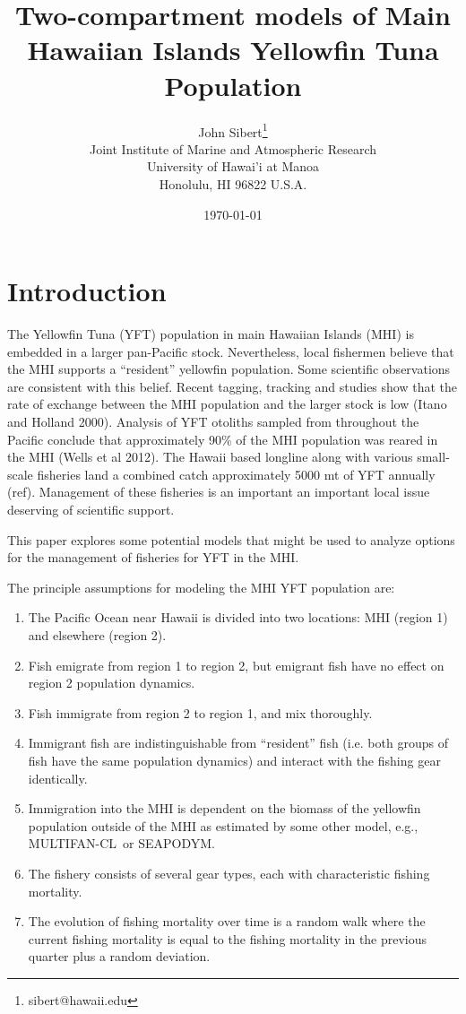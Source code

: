 \documentclass[12pt,letterpaper]{article}
\title{Two-compartment models of Main Hawaiian Islands Yellowfin Tuna
Population}
\author{
John Sibert\thanks{sibert@hawaii.edu}\\
Joint Institute of Marine and Atmospheric Research\\
University of Hawai'i at Manoa\\
Honolulu, HI  96822 U.S.A.\\[0.125in]
\date{\today}
}
\newcommand\doublespacing{\baselineskip=1.6\normalbaselineskip}
\newcommand\SD{SEAPODYM}
\newcommand\MFCL{MULTIFAN-CL}
\begin{document}
\maketitle

\doublespacing

\section*{Introduction}
The Yellowfin Tuna (YFT) population in main Hawaiian Islands (MHI) is
embedded in a larger pan-Pacific stock. Nevertheless, local fishermen
believe that the MHI supports a ``resident'' yellowfin population.
Some scientific observations are consistent with this belief. 
Recent tagging, tracking and
studies show that the rate of exchange between the MHI population
and the larger stock is low (Itano and Holland 2000). Analysis
of YFT otoliths sampled from
throughout the Pacific conclude that approximately 90\% of the MHI
population was reared in the MHI (Wells et al 2012).
The Hawaii based longline along with various small-scale fisheries
land a combined catch
approximately 5000 mt of YFT annually (ref). Management of these
fisheries is an important an important  local issue deserving of scientific support.

This paper explores some potential models that might be used to
analyze options for the management of fisheries for YFT in the MHI.

The principle assumptions for modeling the MHI YFT population are:
\begin{enumerate}
\item The Pacific Ocean near Hawaii is divided into two locations:
MHI (region 1) and elsewhere (region 2).
\item Fish emigrate from region 1 to region 2, but emigrant fish have
no effect on region 2 population dynamics.
\item Fish immigrate from region 2 to region 1, and mix thoroughly.
\item Immigrant fish are indistinguishable from ``resident'' fish
(i.e. both groups of fish have the same population dynamics) and
interact with the fishing gear identically.
\item Immigration into the MHI is dependent on the
biomass of the yellowfin population outside of the MHI as estimated by
some other model, e.g., \MFCL\ or \SD.
\item The fishery consists of several gear types, each with characteristic
fishing mortality.
\item The evolution of fishing mortality over time is a random walk
where the current fishing mortality is equal to the fishing mortality
in the previous quarter plus a random deviation.
\end{enumerate}
\end{document}
